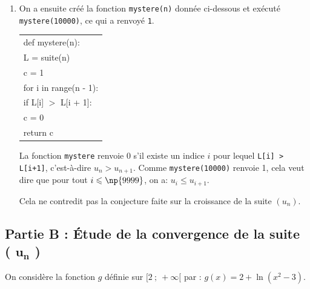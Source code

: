 \begin{enumerate}
La suite $(u_n)$ semble croissante, mais on ne peut pas se prononcer sur sa limite.

		\item On a ensuite créé la fonction \texttt{mystere(n)} donnée ci-dessous et exécuté \linebreak \texttt{mystere(10000)}, ce qui a renvoyé \texttt{1}.



\begin{center}
		\begin{ttfamily}

\begin{tabularx}{\linewidth}{|X|}\hline
			def mystere(n):\\
			\quad L = suite(n)\\
			\quad	c = 1\\
			\quad	for i in range(n - 1):\\
			\qquad	if L[i] $>$ L[i + 1]:\\
			\qquad \quad c = 0\\
			\quad return c\\ \hline

\end{tabularx}
		\end{ttfamily}
		\end{center}

La fonction \texttt{mystere} renvoie 0 s'il existe un indice $i$ pour lequel \texttt{L[i] > L[i+1]}, c'est-à-dire $u_{n}>u_{n+1}$. Comme \texttt{mystere(10000)} renvoie 1, cela veut dire que pour tout $i\leqslant \np{9999}$, on a: $u_{i} \leqslant u_{i+1}$.

Cela ne contredit pas la conjecture faite sur la croissance de la suite $(u_n)$.












	\end{enumerate}

\subsection*{Partie  B : Étude de la convergence de la suite ( $\boldsymbol{u}_{\boldsymbol{n}}$ )}

On considère la fonction $g$ définie sur $[2 ~;~+\infty [$ par :
$g(x)=2+\ln \left(x^{2}-3\right)$.



